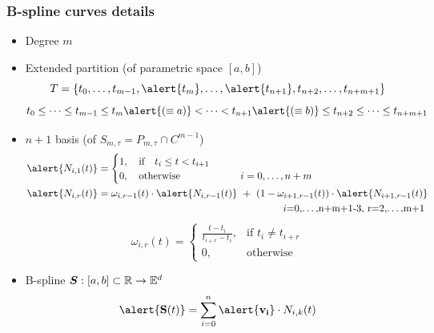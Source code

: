 \begin{frame}
  \frametitle{B-spline curves details}
  \begin{itemize}
  \item Degree \alert{$m$}\pause
  \item Extended \alert{partition} (of parametric
    space \alert{$[a,b]$})
    $$
    T=\{t_0,\dots,t_{m-1},\alert{t_{m}},\dots,\alert{t_{n+1}},t_{n+2},\dots,t_{n+m+1}\}
    $$
    {\tiny
      $$
      t_0\leq\dots\leq t_{m-1}\leq t_{m}\alert{(\equiv a)} <\dots<
      t_{n+1}\alert{(\equiv b)} \leq t_{n+2}\leq\dots\leq t_{n+m+1}
      $$
    }\pause
  \item \alert{$n+1$ basis} (of $S_{m,\tau}=P_{m,\tau}\cap C^{m-1}$)
    {\tiny
      \begin{align*}
        \alert{N_{i,1}(t)} &=
                     \begin{cases}
                       1,\quad \mbox{if}\quad t_i\leq t<t_{i+1}\\
                       0,\quad \mbox{otherwise}\qquad\qquad\qquad i=0,\dots,n+m
                     \end{cases}\\
        \alert{N_{i,r}(t)} &= \omega_{i,r-1}(t)\cdot \alert{N_{i,r-1}(t)}\ +\
                     (1-\omega_{i+1,r-1}(t))\cdot \alert{N_{i+1,r-1}(t)}\\
                   &\pushright i=0,\dots,n+m+1-3,\ r=2,\dots,m+1
      \end{align*}
    }
    {\tiny
      $$
      \omega_{i,r}(t) = \begin{cases}
        \frac{t-t_i}{t_{i+r}-t_i},&\mbox{if }t_i\neq t_{i+r}\\
        0, &\mbox{otherwise}
      \end{cases}
      $$
    }\pause
  \item B-spline $\boldsymbol{S}:[a,b]\subset\mathbb{R}\rightarrow\mathbb{E}^d$
    $$
    \alert{\mathbf{S}(t)}=\sum_{i=0}^n\alert{\mathbf{v_i}}\cdot N_{i,k}(t)
    $$
  \end{itemize}
\end{frame}

